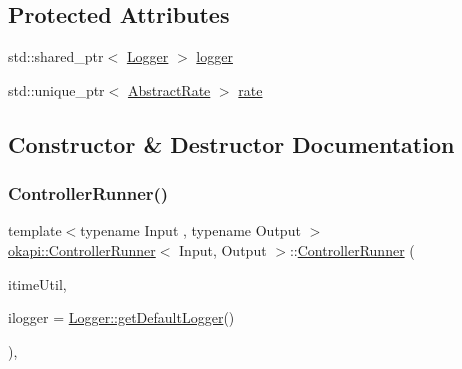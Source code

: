 \subsection*{Protected Attributes}
\begin{DoxyCompactItemize}
\item 
std\+::shared\+\_\+ptr$<$ \mbox{\hyperlink{classokapi_1_1Logger}{Logger}} $>$ \mbox{\hyperlink{classokapi_1_1ControllerRunner_a0a4d64e7f687666140602d0b6e47a377}{logger}}
\item 
std\+::unique\+\_\+ptr$<$ \mbox{\hyperlink{classokapi_1_1AbstractRate}{Abstract\+Rate}} $>$ \mbox{\hyperlink{classokapi_1_1ControllerRunner_ac3c13044655d54c89e5bb14b1c6bc5f6}{rate}}
\end{DoxyCompactItemize}


\subsection{Constructor \& Destructor Documentation}
\mbox{\label{classokapi_1_1ControllerRunner_a48f341d8073ec533b09307d48b719bb7}} 
\subsubsection{\texorpdfstring{ControllerRunner()}{ControllerRunner()}}
{\footnotesize\ttfamily template$<$typename Input , typename Output $>$ \\
\mbox{\hyperlink{classokapi_1_1ControllerRunner}{okapi\+::\+Controller\+Runner}}$<$ Input, Output $>$\+::\mbox{\hyperlink{classokapi_1_1ControllerRunner}{Controller\+Runner}} (\begin{DoxyParamCaption}\item[{const \mbox{\hyperlink{classokapi_1_1TimeUtil}{Time\+Util}} \&}]{itime\+Util,  }\item[{const std\+::shared\+\_\+ptr$<$ \mbox{\hyperlink{classokapi_1_1Logger}{Logger}} $>$ \&}]{ilogger = {\ttfamily \mbox{\hyperlink{classokapi_1_1Logger_a5053cf778b4b55acba788a3797dc96d2}{Logger\+::get\+Default\+Logger}}()} }\end{DoxyParamCaption})\hspace{0.3cm}{\ttfamily [inline]}, {\ttfamily [explicit]}}

